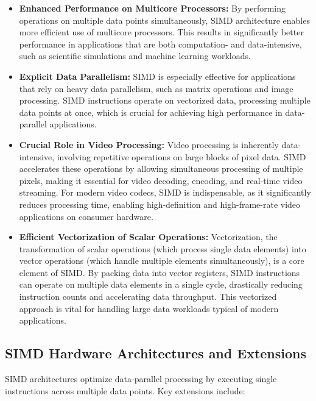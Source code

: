 \documentclass[12pt,a4paper]{article}
\begin{document}
\begin{itemize}
    \item \textbf{Enhanced Performance on Multicore Processors:} By performing operations on multiple data points simultaneously, SIMD architecture enables more efficient use of multicore processors. This results in significantly better performance in applications that are both computation- and data-intensive, such as scientific simulations and machine learning workloads.

    \item \textbf{Explicit Data Parallelism:} SIMD is especially effective for applications that rely on heavy data parallelism, such as matrix operations and image processing. SIMD instructions operate on vectorized data, processing multiple data points at once, which is crucial for achieving high performance in data-parallel applications.

    \item \textbf{Crucial Role in Video Processing:} Video processing is inherently data-intensive, involving repetitive operations on large blocks of pixel data. SIMD accelerates these operations by allowing simultaneous processing of multiple pixels, making it essential for video decoding, encoding, and real-time video streaming. For modern video codecs, SIMD is indispensable, as it significantly reduces processing time, enabling high-definition and high-frame-rate video applications on consumer hardware.

    \item \textbf{Efficient Vectorization of Scalar Operations:} Vectorization, the transformation of scalar operations (which process single data elements) into vector operations (which handle multiple elements simultaneously), is a core element of SIMD. By packing data into vector registers, SIMD instructions can operate on multiple data elements in a single cycle, drastically reducing instruction counts and accelerating data throughput. This vectorized approach is vital for handling large data workloads typical of modern applications.
\end{itemize}

\subsection{SIMD Hardware Architectures and Extensions}

SIMD architectures optimize data-parallel processing by executing single instructions across multiple data points. Key extensions include:
\end{document}
